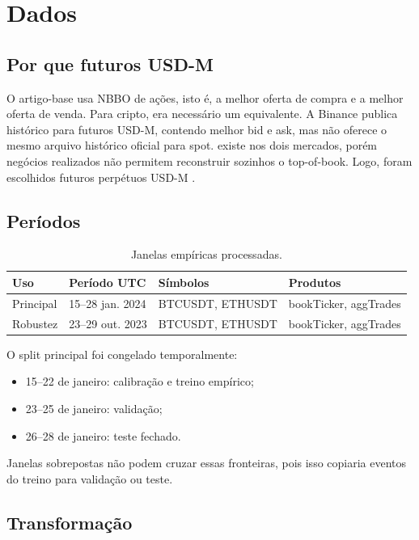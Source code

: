 \documentclass[12pt,a4paper]{report}
\begin{document}
\chapter{Dados}

\section{Por que futuros USD-M}

O artigo-base usa NBBO de ações, isto é, a melhor oferta de compra e a melhor oferta
de venda. Para cripto, era necessário um equivalente. A Binance publica
 histórico para futuros USD-M, contendo melhor bid e ask, mas não
oferece o mesmo arquivo histórico oficial para spot.  existe nos
dois mercados, porém negócios realizados não permitem reconstruir sozinhos o
top-of-book. Logo, foram escolhidos futuros perpétuos USD-M \citep{binancePublicData}.

\section{Períodos}

\begin{table}[ht]
\centering
\caption{Janelas empíricas processadas.}
\begin{tabular}{llll}
\toprule
Uso & Período UTC & Símbolos & Produtos\\
\midrule
Principal & 15--28 jan. 2024 & BTCUSDT, ETHUSDT & bookTicker, aggTrades\\
Robustez & 23--29 out. 2023 & BTCUSDT, ETHUSDT & bookTicker, aggTrades\\
\bottomrule
\end{tabular}
\end{table}

O split principal foi congelado temporalmente:
\begin{itemize}
  \item 15--22 de janeiro: calibração e treino empírico;
  \item 23--25 de janeiro: validação;
  \item 26--28 de janeiro: teste fechado.
\end{itemize}
Janelas sobrepostas não podem cruzar essas fronteiras, pois isso copiaria eventos do
treino para validação ou teste.

\section{Transformação}
\end{document}
